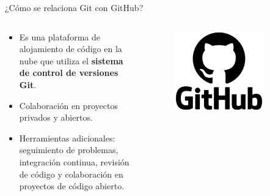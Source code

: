 \documentclass{beamer}
\begin{document}
\begin{frame}{¿Cómo se relaciona Git con GitHub?} 


  \begin{columns}
    \begin{column}{.6\textwidth}

      \begin{itemize}[<+->]

        \item Es una plataforma de alojamiento de código en la nube que utiliza el \textbf{sistema de control de versiones Git}.
        \item Colaboración en proyectos privados y abiertos. 
        \item Herramientas adicionales: seguimiento de problemas, integración continua, revisión de código y colaboración en proyectos de código abierto.
      \end{itemize}
      
    \end{column}

    \begin{column}{.4\textwidth}
      \begin{figure}
        \includegraphics[width=0.8\textwidth]{images/logo_github.png}
      \end{figure}
    \end{column}

  \end{columns}
  

\end{frame}





 
\end{document}
